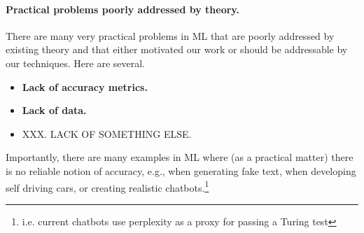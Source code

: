 \paragraph{Practical problems poorly addressed by theory.}
There are many very practical problems in ML that are poorly addressed by existing theory and that either motivated our work or should be addressable by our techniques.
Here are several.
\begin{itemize}
\item
\textbf{Lack of accuracy metrics.}
\item
\textbf{Lack of data.}
\item
XXX. LACK OF SOMETHING ELSE.
\end{itemize}
Importantly, there are many examples in ML where (as a practical matter) there is no reliable notion of accuracy, e.g., when generating fake text, when developing self driving cars, or creating realistic chatbots.\footnote{i.e. current chatbots use perplexity as a proxy for passing a Turing test}
